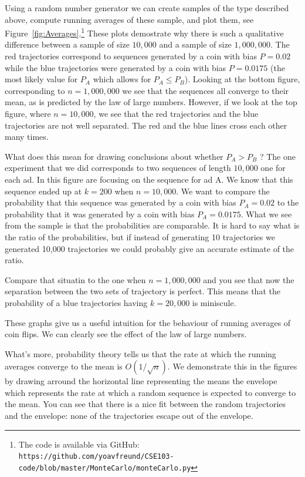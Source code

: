 Using a random number generator we can create samples of the type
described above, compute running averages of these sample, and plot
them, see Figure~\ref{fig:Averages}.\footnote{The code is available
  via GitHub: {\tt
    https://github.com/yoavfreund/CSE103-code/blob/master/MonteCarlo/monteCarlo.py}}
These plots demostrate why there is such a qualitative difference
between a sample of size $10,000$ and a sample of size
$1,000,000$. The red trajectories correspond to sequences generated by
a coin with bias $P=0.02$ while the blue trajectories were generated
by a coin with bias $P=0.0175$ (the most likely value for $P_A$ which
allows for $P_A \leq P_B$). Looking at the bottom figure,
corresponding to $n=1,000,000$ we see that the sequences all converge
to their mean, as is predicted by the law of large numbers. However,
if we look at the top figure, where $n=10,000$, we see that the red
trajectories and the blue trajectories are not well separated. The red
and the blue lines cross each other many times.

What does this mean for drawing conclusions about whether $P_A>P_B$ ?
The one experiment that we did corresponds to two sequences of length
$10,000$ one for each ad. In this figure are focusing on the sequence
for ad A. We know that this sequence ended up at $k=200$ when
$n=10,000$. We want to compare the probability that this sequence was
generated by a coin with bias $P_A=0.02$ to the probability that it
was generated by a coin with bias $P_A=0.0175$. What we see from the
sample is that the probabilities are comparable. It is hard to say
what is the ratio of the probabilities, but if instead of generating
10 trajectories we generated 10,000 trajectories we could probably
give an accurate estimate of the ratio.

Compare that situatin to the one when $n=1,000,000$ and you see that
now the separation between the two sets of trajectory is perfect. This
means that the probability of a blue trajectories having $k=20,000$ is
miniscule.

These graphs give us a useful intuition for the behaviour of running
averages of coin flips. We can clearly see the effect of the law of
large numbers.

What's more, probability theory tells us that the rate at which the
running averages converge to the mean is $O(1/\sqrt{n})$. We
demonstrate this in the figures by drawing arround the horizontal line
representing the means the envelope which represents the rate at which
a random sequence is expected to converge to the mean. You can see
that there is a nice fit between the random trajectories and the
envelope: none of the trajectories escape out of the envelope.

